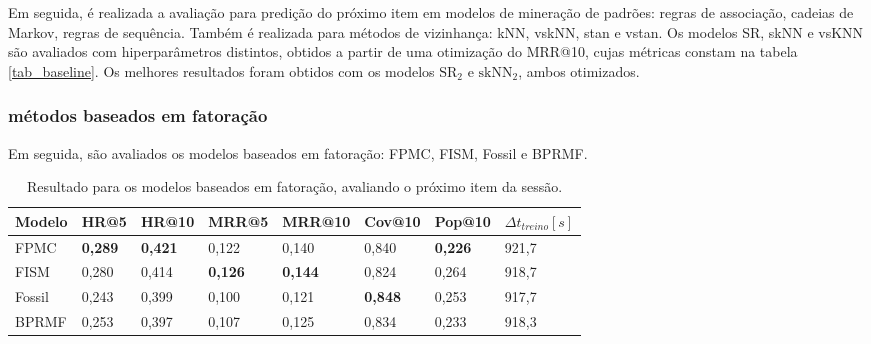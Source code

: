\begin{table}[htbp]
  \label{tab_baseline}  
\end{table}

Em seguida, é realizada a avaliação para predição do próximo item em modelos de
mineração de padrões: regras de associação, cadeias de Markov, regras de
sequência. Também é realizada para métodos de vizinhança: kNN, vskNN, stan e
vstan. Os modelos SR, skNN e vsKNN são avaliados com hiperparâmetros distintos,
obtidos a partir de uma otimização do MRR@10, cujas métricas constam na tabela
\ref{tab_baseline}. Os melhores resultados foram obtidos com os modelos
$\text{SR}_{2}$ e $\text{skNN}_{2}$, ambos otimizados.






\subsubsection{métodos baseados em fatoração}
Em seguida, são avaliados os modelos baseados em fatoração: FPMC, FISM, Fossil
e BPRMF.

\begin{table}[htbp]
  \centering
  \begin{tabular}{|l|l|l|l|l|l|l|l|}
    \hline
    Modelo & HR@5 & HR@10 & MRR@5 & MRR@10 & Cov@10 & Pop@10 & $\Delta t_{treino} [s]$ \\
    \hline
    FPMC & \textbf{0,289} & \textbf{0,421} & 0,122 & 0,140 & 0,840 & \textbf{0,226} & 921,7 \\
    \hline
    FISM & 0,280 & 0,414 & \textbf{0,126} & \textbf{0,144} & 0,824 & 0,264 & 918,7 \\
    \hline
    Fossil & 0,243 & 0,399 & 0,100 & 0,121 & \textbf{0,848} & 0,253 & 917,7 \\
    \hline
    BPRMF & 0,253 & 0,397 & 0,107 & 0,125 & 0,834 & 0,233 & 918,3 \\
    \hline
  \end{tabular}
  \caption{Resultado para os modelos baseados em fatoração, avaliando o próximo item da sessão.}
  \label{tab_fatoracao}
\end{table}

